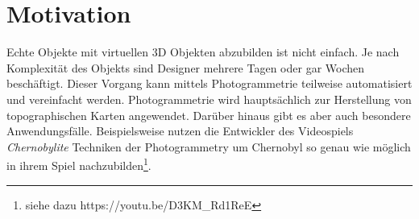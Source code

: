 
\chapter{Motivation}
Echte Objekte mit virtuellen 3D Objekten abzubilden ist nicht einfach. Je nach Komplexität des Objekts sind Designer mehrere Tagen oder gar Wochen beschäftigt.
Dieser Vorgang kann mittels Photogrammetrie teilweise automatisiert und vereinfacht werden.
Photogrammetrie wird hauptsächlich zur Herstellung von topographischen Karten angewendet\cite{kraus_2004}.
Darüber hinaus gibt es aber auch besondere Anwendungsfälle.
Beispielsweise nutzen die Entwickler des Videospiels \emph{Chernobylite} Techniken der Photogrammetry um Chernobyl so genau wie möglich in ihrem Spiel nachzubilden\footnote{siehe dazu https://youtu.be/D3KM\_Rd1ReE}.